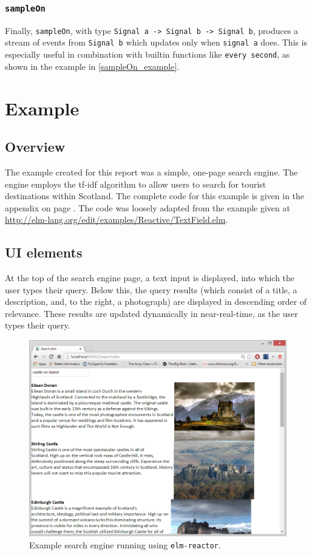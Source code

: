 \documentclass[12pt]{article}
\begin{document}
\subsubsection{\texttt{sampleOn}}
Finally, \texttt{sampleOn}, with type \texttt{Signal a -> Signal b -> Signal b}, produces a stream of events from \texttt{Signal b} which updates only when \texttt{signal a} does. This is especially useful in combination with builtin functions like \texttt{every second}, as shown in the example in \ref{sampleOn_example}.



\section{Example}

\subsection{Overview}
The example created for this report was a simple, one-page search engine. The engine 
employs the tf-idf algorithm to allow users to search for tourist destinations within
Scotland. The complete code for this example is given in the appendix on page \pageref{app:A}. The code was loosely adapted from the example given at 
\url{http://elm-lang.org/edit/examples/Reactive/TextField.elm}.

\subsection{UI elements}
At the top of the search engine page, a text input is displayed, into which the user
types their query. Below this, the query results (which consist of a title, a 
description, and, to the right, a photograph) are displayed in descending order of
relevance. These results are updated dynamically in near-real-time, as the user types 
their query.

\begin{figure}[ht!]
\centering
\includegraphics[width=140mm]{castle_island.png}
\caption{Example search engine running using \texttt{elm-reactor}.}
\end{figure}
\end{document}
